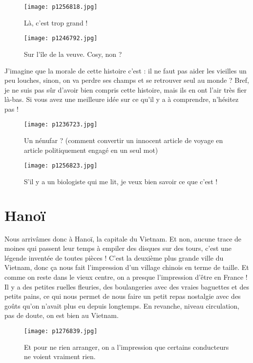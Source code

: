 \documentclass{book}
\begin{document}
\begin{figure}[h]
\centering
\texttt{[image: p1256818.jpg]}
\caption*{Là, c'est trop grand !}
\end{figure}

\begin{figure}[h]
\centering
\texttt{[image: p1246792.jpg]}
\caption*{Sur l'île de la veuve. Cosy, non ?}
\end{figure}

J'imagine que la morale de cette histoire c'est : il ne faut pas aider les vieilles un peu louches, sinon, on va perdre ses champs et se retrouver seul au monde ? Bref, je ne suis pas sûr d'avoir bien compris cette histoire, mais ils en ont l'air très fier là-bas. Si vous avez une meilleure idée sur ce qu'il y a à comprendre, n'hésitez pas !


\begin{figure}[h]
\centering
\texttt{[image: p1236723.jpg]}
\caption*{Un nénufar ? (comment convertir un innocent article de voyage en article politiquement engagé en un seul mot)}
\end{figure}


\begin{figure}[h]
\centering
\texttt{[image: p1256823.jpg]}
\caption*{S'il y a un biologiste qui me lit, je veux bien savoir ce que c'est !}
\end{figure}



\chapter{Hanoï}
Nous arrivâmes donc à Hanoï, la capitale du Vietnam. Et non, aucune trace de moines qui passent leur temps à empiler des disques sur des tours, c'est une légende inventée de toutes pièces ! C'est la deuxième plus grande ville du Vietnam, donc ça nous fait l'impression d'un village chinois en terme de taille. Et comme on reste dans le vieux centre, on a presque l'impression d'être en France ! Il y a des petites ruelles fleuries, des boulangeries avec des vraies baguettes et des petits pains, ce qui nous permet de nous faire un petit repas nostalgie avec des goûts qu'on n'avait plus eu depuis longtemps. En revanche, niveau circulation, pas de doute, on est bien au Vietnam.


\begin{figure}[h]
\centering
\texttt{[image: p1276839.jpg]}
\caption*{Et pour ne rien arranger, on a l'impression que certains conducteurs ne voient vraiment rien.}
\end{figure}
\end{document}
